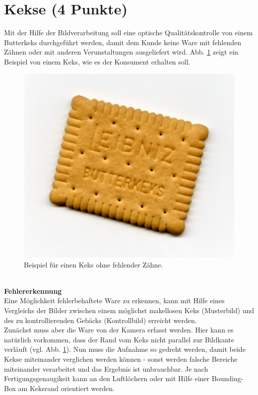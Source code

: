 \documentclass{ezb}
\begin{document}
\section{Kekse (4 Punkte)}
Mit der Hilfe der Bildverarbeitung soll eine optische Qualitätskontrolle von einem Butterkeks durchgeführt werden, damit dem Kunde keine Ware mit fehlenden Zähnen oder mit anderen Verunstaltungen ausgeliefert wird. Abb. \ref{fig:keks_original} zeigt ein Beispiel von einem Keks, wie es der Konsument erhalten soll.
\begin{figure}[!h]
\begin{center}
    \includegraphics[scale=0.3]{Keks_original.png}
\end{center}
    \caption{Beispiel für einen Keks ohne fehlender Zähne.}
    \label{fig:keks_original}
\end{figure}\\
\newline
\textbf{{\large Fehlererkennung}}\\
\newline
Eine Möglichkeit fehlerbehaftete Ware zu erkennen, kann mit Hilfe eines Vergleichs der Bilder zwischen einem möglichst makellosen Keks (Musterbild) und des zu kontrollierenden Gebäcks (Kontrollbild) erreicht werden.\\
\newline
Zunächst muss aber die Ware von der Kamera erfasst werden. Hier kann es natürlich vorkommen, dass der Rand vom Keks nicht parallel zur Bildkante verläuft (vgl. Abb. \ref{fig:keks_original}). Nun muss die Aufnahme so gedreht werden, damit beide Kekse miteinander verglichen werden können - sonst werden falsche Bereiche miteinander verarbeitet und das Ergebnis ist unbrauchbar. Je nach Fertigungsgenaugikeit kann an den Luftlöchern oder mit Hilfe einer Bounding-Box am Keksrand orientiert werden.\\
\end{document}
